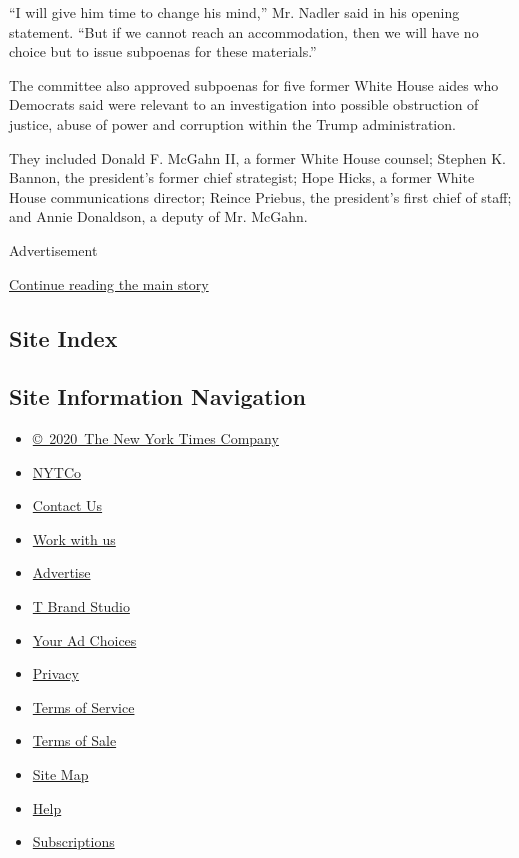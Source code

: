 ``I will give him time to change his mind,'' Mr. Nadler said in his
opening statement. ``But if we cannot reach an accommodation, then we
will have no choice but to issue subpoenas for these materials.''

The committee also approved subpoenas for five former White House aides
who Democrats said were relevant to an investigation into possible
obstruction of justice, abuse of power and corruption within the Trump
administration.

They included Donald F. McGahn II, a former White House counsel; Stephen
K. Bannon, the president's former chief strategist; Hope Hicks, a former
White House communications director; Reince Priebus, the president's
first chief of staff; and Annie Donaldson, a deputy of Mr. McGahn.

Advertisement

\protect\hyperlink{after-bottom}{Continue reading the main story}

\hypertarget{site-index}{%
\subsection{Site Index}\label{site-index}}

\hypertarget{site-information-navigation}{%
\subsection{Site Information
Navigation}\label{site-information-navigation}}

\begin{itemize}
\tightlist
\item
  \href{https://help.nytimes.com/hc/en-us/articles/115014792127-Copyright-notice}{©~2020~The
  New York Times Company}
\end{itemize}

\begin{itemize}
\tightlist
\item
  \href{https://www.nytco.com/}{NYTCo}
\item
  \href{https://help.nytimes.com/hc/en-us/articles/115015385887-Contact-Us}{Contact
  Us}
\item
  \href{https://www.nytco.com/careers/}{Work with us}
\item
  \href{https://nytmediakit.com/}{Advertise}
\item
  \href{http://www.tbrandstudio.com/}{T Brand Studio}
\item
  \href{https://www.nytimes.com/privacy/cookie-policy\#how-do-i-manage-trackers}{Your
  Ad Choices}
\item
  \href{https://www.nytimes.com/privacy}{Privacy}
\item
  \href{https://help.nytimes.com/hc/en-us/articles/115014893428-Terms-of-service}{Terms
  of Service}
\item
  \href{https://help.nytimes.com/hc/en-us/articles/115014893968-Terms-of-sale}{Terms
  of Sale}
\item
  \href{https://spiderbites.nytimes.com}{Site Map}
\item
  \href{https://help.nytimes.com/hc/en-us}{Help}
\item
  \href{https://www.nytimes.com/subscription?campaignId=37WXW}{Subscriptions}
\end{itemize}
